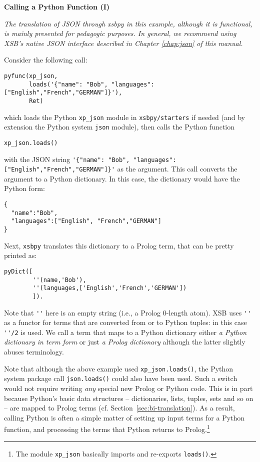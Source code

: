 \begin{example} \rm {\bf Calling a Python Function (I)}

  {{\em The translation of JSON through xsbpy in this example,
      although it is functional, is mainly presented for pedagogic
      purposes.  In general, we recommend using XSB's native JSON
      interface described in Chapter \ref{chap:json} of this manual.
  }}

  
\noindent  
Consider the following call:

 \begin{verbatim}
pyfunc(xp_json,
       loads('{"name": "Bob", "languages": ["English","French","GERMAN"]}'),
       Ret)
\end{verbatim}
 
\noindent 
which loads the Python {\tt xp\_json} module in {\tt xsbpy/starters}
if needed (and by extension the Python system {\tt json} module), then
calls the Python function

{\tt xp\_json.loads()}

\noindent
with the JSON string
\verb|'{"name": "Bob", "languages": ["English","French","GERMAN"]}'|
as the argument.
This call converts the argument to a Python
dictionary.  In this case, the dictionary would have the Python form:
\begin{verbatim}
{
  "name":"Bob",
  "languages":["English", "French","GERMAN"]
}
\end{verbatim}
Next,
{\tt xsbpy} translates this dictionary to a Prolog term, that can
be pretty printed as:
\begin{verbatim}
pyDict([
        ''(name,'Bob'),
        ''(languages,['English','French','GERMAN'])
        ]).
\end{verbatim}
Note that \verb|''| here is an empty string (i.e., a Prolog 0-length
atom).  XSB uses \verb|''| as a functor for terms that are converted
from or to Python tuples: in this case \verb|''/2| is used.  We call a
term that maps to a Python dictionary either {\em a Python dictionary
  in term form} or just {\em a Prolog dictionary} although the latter
slightly abuses terminology.
\end{example}

Note that although the above example used {\tt xp\_json.loads()}, the
Python system package call {\tt json.loads()} could also have been
used.  Such a switch would not require writing {\em any} special
new Prolog or Python code.  This is in part because Python's basic data
structures -- dictionaries, lists, tuples, sets and so on -- are
mapped to Prolog terms (cf. Section~\ref{sec:bi-translation}).  As a
result, calling Python is often a simple matter of setting up input
terms for a Python function, and processing the terms that Python
returns to Prolog.\footnote{The module {\tt xp\_json} basically
  imports and re-exports {\tt loads()}.}

